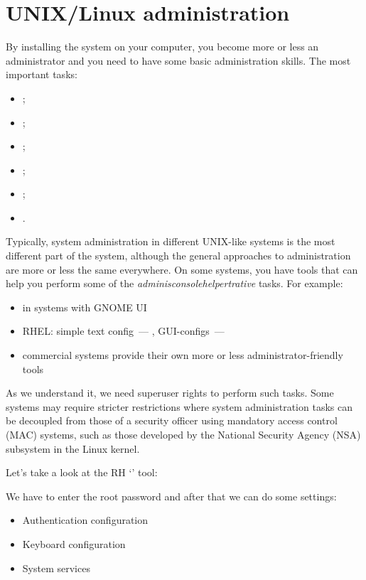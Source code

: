 \section*{UNIX/Linux administration} %

By installing the system on your computer, you become more or less
an administrator and you need to have some basic administration skills.
The most important tasks:
\begin{itemize}
\item {};
\item {};
\item {};
\item {};
\item {};
\item {}.
\end{itemize}

Typically, system administration in different UNIX-like systems is the most
different part of the system, although the general approaches to administration
are more or less the same everywhere. On some systems, you have tools that can
help you perform some of the \emph{adminisconsolehelpertrative} tasks.
For example:
\begin{itemize}
\item {} in systems with GNOME UI
\item RHEL: simple text config~--- , GUI-configs~--- 
\item commercial systems provide their own more or less administrator-friendly tools
\end{itemize}

As we understand it, we need superuser rights to perform such tasks.
Some systems may require stricter restrictions where system administration
tasks can be decoupled from those of a security officer using mandatory
access control (MAC) systems, such as those developed by the National
Security Agency (NSA)  subsystem in the Linux kernel.

Let's take a look at the RH `' tool:
We have to enter the root password and after that we can do some settings:
\begin{itemize}
\item Authentication configuration
\item Keyboard configuration
\item System services
\end{itemize}

